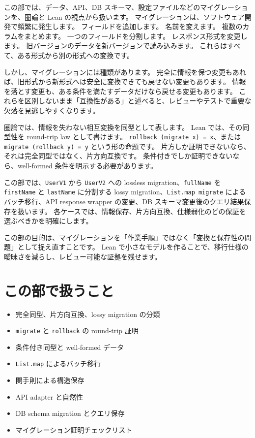 
この部では、データ、API、DB スキーマ、設定ファイルなどのマイグレーションを、圏論と Lean の視点から扱います。
マイグレーションは、ソフトウェア開発で頻繁に発生します。
フィールドを追加します。
名前を変えます。
複数のカラムをまとめます。
一つのフィールドを分割します。
レスポンス形式を変更します。
旧バージョンのデータを新バージョンで読み込みます。
これらはすべて、ある形式から別の形式への変換です。

しかし、マイグレーションには種類があります。
完全に情報を保つ変更もあれば、旧形式から新形式へは安全に変換できても戻せない変更もあります。
情報を落とす変更も、ある条件を満たすデータだけなら戻せる変更もあります。
これらを区別しないまま「互換性がある」と述べると、レビューやテストで重要な欠落を見逃しやすくなります。

圏論では、情報を失わない相互変換を同型として表します。
Lean では、その同型性を round-trip law として書けます。
\texttt{rollback (migrate x) = x}、または \texttt{migrate (rollback y) = y} という形の命題です。
片方しか証明できないなら、それは完全同型ではなく、片方向互換です。
条件付きでしか証明できないなら、well-formed 条件を明示する必要があります。

この部では、\texttt{UserV1} から \texttt{UserV2} への lossless migration、\texttt{fullName} を \texttt{firstName} と \texttt{lastName} に分割する lossy migration、\texttt{List.map migrate} によるバッチ移行、API response wrapper の変更、DB スキーマ変更後のクエリ結果保存を扱います。
各ケースでは、情報保存、片方向互換、仕様弱化のどの保証を選ぶべきかを明確にします。

この部の目的は、マイグレーションを「作業手順」ではなく「変換と保存性の問題」として捉え直すことです。
Lean で小さなモデルを作ることで、移行仕様の曖昧さを減らし、レビュー可能な証拠を残せます。

\section*{この部で扱うこと}

\begin{itemize}
\item 完全同型、片方向互換、lossy migration の分類
\item \texttt{migrate} と \texttt{rollback} の round-trip 証明
\item 条件付き同型と well-formed データ
\item \texttt{List.map} によるバッチ移行
\item 関手則による構造保存
\item API adapter と自然性
\item DB schema migration とクエリ保存
\item マイグレーション証明チェックリスト
\end{itemize}
